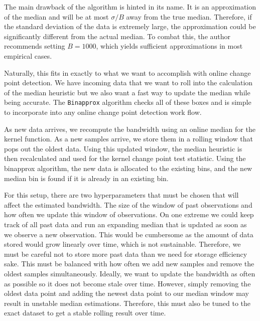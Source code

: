 The main drawback of the algorithm is hinted in its name. It is an approximation of the median and will be at most $\sigma / B$ away from the true median. Therefore, if the standard deviation of the data is extremely large,
the approximation could be significantly different from the actual median. To combat this, the author recommends setting $B=1000$, which yields sufficient approximations in most empirical cases.

Naturally, this fits in exactly to what we want to accomplish with online change point detection. We have incoming data that we want to roll into the calculation of the median heuristic but we also want a fast way to update the median while being accurate. The \texttt{Binapprox} algorithm checks all of these boxes and is simple to incorporate into any online change point detection work flow. 

As new data arrives, we recompute the bandwidth using an online median for the kernel function. As a new samples arrive, we store them in a rolling window that pops out the oldest data. Using this updated window, the median heuristic is then recalculated and used for the kernel change point test statistic. Using the binapprox algorithm, the new data is allocated to the existing bins, and the new median bin is found if it is already in an existing bin. 

For this setup, there are two hyperparameters that must be chosen that will affect the estimated bandwidth. The size of the window of past observations and how often we update this window of observations. On one extreme we could keep track of all past data and run an expanding median that is updated as soon as we observe a new observation. This would be cumbersome as the amount of data stored would grow linearly over time, which is not sustainable. Therefore, we must be careful not to store more past data than we need for storage efficiency sake. This must be balanced with how often we add new samples and remove the oldest samples simultaneously. Ideally, we want to update the bandwidth as often as possible so it does not become stale over time. However, simply removing the oldest data point and adding the newest data point to our median window may result in unstable median estimations. Therefore, this must also be tuned to the exact dataset to get a stable rolling result over time.

